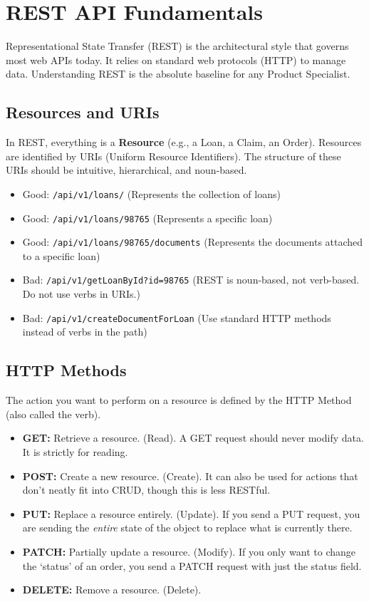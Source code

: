 \documentclass[
  11pt,
  openany,
  oneside]{book}
\providecommand{\tightlist}{%
  \setlength{\itemsep}{0pt}\setlength{\parskip}{0pt}}
\begin{document}
\section{REST API Fundamentals}\label{rest-api-fundamentals}

Representational State Transfer (REST) is the architectural style that
governs most web APIs today. It relies on standard web protocols (HTTP)
to manage data. Understanding REST is the absolute baseline for any
Product Specialist.

\subsection{Resources and URIs}\label{resources-and-uris}

In REST, everything is a \textbf{Resource} (e.g., a Loan, a Claim, an
Order). Resources are identified by URIs (Uniform Resource Identifiers).
The structure of these URIs should be intuitive, hierarchical, and
noun-based.

\begin{itemize}
\tightlist
\item
  Good: \texttt{/api/v1/loans/} (Represents the collection of loans)
\item
  Good: \texttt{/api/v1/loans/98765} (Represents a specific loan)
\item
  Good: \texttt{/api/v1/loans/98765/documents} (Represents the documents
  attached to a specific loan)
\item
  Bad: \texttt{/api/v1/getLoanById?id=98765} (REST is noun-based, not
  verb-based. Do not use verbs in URIs.)
\item
  Bad: \texttt{/api/v1/createDocumentForLoan} (Use standard HTTP methods
  instead of verbs in the path)
\end{itemize}

\subsection{HTTP Methods}\label{http-methods}

The action you want to perform on a resource is defined by the HTTP
Method (also called the verb).

\begin{itemize}
\tightlist
\item
  \textbf{GET:} Retrieve a resource. (Read). A GET request should never
  modify data. It is strictly for reading.
\item
  \textbf{POST:} Create a new resource. (Create). It can also be used
  for actions that don't neatly fit into CRUD, though this is less
  RESTful.
\item
  \textbf{PUT:} Replace a resource entirely. (Update). If you send a PUT
  request, you are sending the \emph{entire} state of the object to
  replace what is currently there.
\item
  \textbf{PATCH:} Partially update a resource. (Modify). If you only
  want to change the `status' of an order, you send a PATCH request with
  just the status field.
\item
  \textbf{DELETE:} Remove a resource. (Delete).
\end{itemize}
\end{document}
